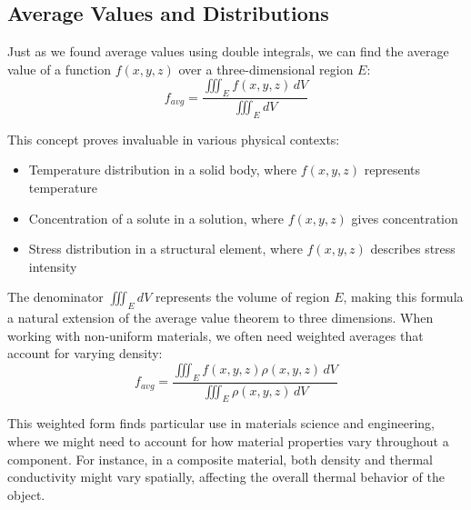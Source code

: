 \subsection*{Average Values and Distributions}  

\noindent Just as we found average values using double integrals, we can find the average value of a function $f(x,y,z)$ over a three-dimensional region $E$:
\[
f_{avg} = \frac{\iiint_E f(x,y,z)\,dV}{\iiint_E dV}
\]

\noindent This concept proves invaluable in various physical contexts:
\begin{itemize}
\item Temperature distribution in a solid body, where $f(x,y,z)$ represents temperature
\item Concentration of a solute in a solution, where $f(x,y,z)$ gives concentration
\item Stress distribution in a structural element, where $f(x,y,z)$ describes stress intensity
\end{itemize}

\noindent The denominator $\iiint_E dV$ represents the volume of region $E$, making this formula a natural extension of the average value theorem to three dimensions. When working with non-uniform materials, we often need weighted averages that account for varying density:
\[
f_{avg} = \frac{\iiint_E f(x,y,z)\rho(x,y,z)\,dV}{\iiint_E \rho(x,y,z)\,dV}
\]

\noindent This weighted form finds particular use in materials science and engineering, where we might need to account for how material properties vary throughout a component. For instance, in a composite material, both density and thermal conductivity might vary spatially, affecting the overall thermal behavior of the object.


